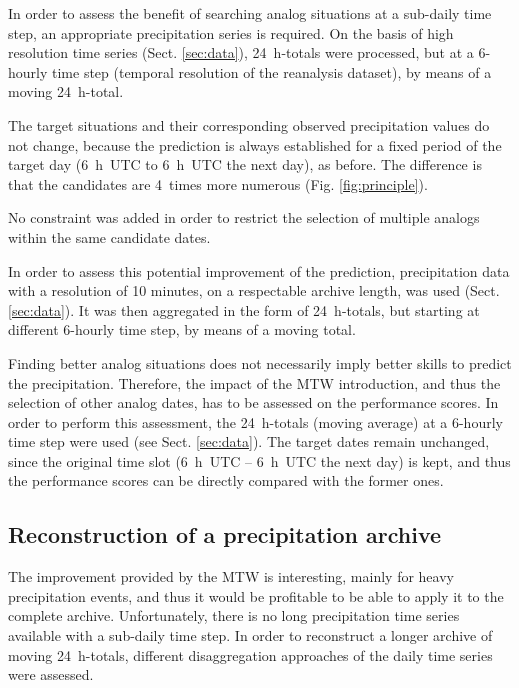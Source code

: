 \documentclass[hess, manuscript]{copernicus}
\begin{document}
In order to assess the benefit of searching analog situations at a sub-daily time step, an appropriate precipitation series is required. On the basis of high resolution time series (Sect. \ref{sec:data}), 24~h-totals were processed, but at a 6-hourly time step (temporal resolution of the reanalysis dataset), by means of a moving 24~h-total. 

The target situations and their corresponding observed precipitation values do not change, because the prediction is always established for a fixed period of the target day (6~h~UTC to 6~h~UTC the next day), as before. The difference is that the candidates are 4~times more numerous (Fig. \ref{fig:principle}).

No constraint was added in order to restrict the selection of multiple analogs within the same candidate dates.



In order to assess this potential improvement of the prediction, precipitation data with a resolution of 10 minutes, on a respectable archive length, was used (Sect. \ref{sec:data}). It was then aggregated in the form of 24~h-totals, but starting at different 6-hourly time step, by means of a moving total.




Finding better analog situations does not necessarily imply better skills to predict the precipitation. Therefore, the impact of the MTW introduction, and thus the selection of other analog dates, has to be assessed on the performance scores. In order to perform this assessment, the 24~h-totals (moving average) at a 6-hourly time step were used (see Sect. \ref{sec:data}). The target dates remain unchanged, since the original time slot (6~h~UTC -- 6~h~UTC the next day) is kept, and thus the performance scores can be directly compared with the former ones.


\subsection{Reconstruction of a precipitation archive}
\label{sec:reconstruction}

The improvement provided by the MTW is interesting, mainly for heavy precipitation events, and thus it would be profitable to be able to apply it to the complete archive. Unfortunately, there is no long precipitation time series available with a sub-daily time step. In order to reconstruct a longer archive of moving 24~h-totals, different disaggregation approaches of the daily time series were assessed.
\end{document}
